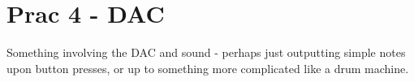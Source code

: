 \section{Prac 4 - DAC}
Something involving the DAC and sound - perhaps just outputting simple notes upon button presses, or up to something more complicated like a drum machine. 
